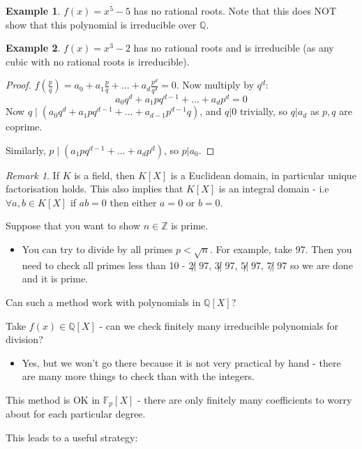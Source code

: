 \documentclass{article}
\theoremstyle{definition}
\newtheorem{exmp}{Example}[section]
\theoremstyle{plain}%
\theoremstyle{remark}
\newtheorem*{rem}{Remark}
\newcommand{\Q}{\mathbb{Q}}
\newcommand{\Z}{\mathbb{Z}}
\newcommand{\F}{\mathbb{F}}
\begin{document}
\begin{exmp}
    $f(x) = x^5 - 5$ has no rational roots. Note that this does NOT show that this polynomial is irreducible over $\Q$.
\end{exmp}

\begin{exmp}
    $f(x) = x^3 - 2$ has no rational roots and is irreducible (as any cubic with no rational roots is irreducible).
\end{exmp}

\begin{proof}
    $f(\frac{p}{q}) = a_0 + a_1 \frac{p}{q} + ... + a_d \frac{p^d}{q^d} = 0$. Now multiply by $q^d$:
    \[a_0q^d + a_1pq^{d-1} + ... + a_d p^d = 0\]
    Now $q \; |\; (a_0q^d + a_1pq^{d-1} + ... + a_{d-1}p^{d-1}q)$, and $q | 0$ trivially, so $q | a_d$ as $p, q$ are coprime.
    
    Similarly, $p \; | \; (a_1pq^{d-1} + ... + a_dp^d)$, so $p | a_0$.
\end{proof}

\begin{rem}
    If $K$ is a field, then $K[X]$ is a Euclidean domain, in particular unique factorisation holds. This also implies that $K[X]$ is an integral domain - i.e $\forall a,b \in K[X]$ if $ab = 0$ then either $a = 0$ or $b = 0$.
\end{rem}

Suppose that you want to show $n \in \Z$ is prime.
\begin{itemize}
    \item You can try to divide by all primes $p < \sqrt{n}$. For example, take $97$. Then you need to check all primes less than 10 - $2 \not | \; 97$, $3 \not | \; 97$, $5 \not | \; 97$, $7 \not | \; 97$ so we are done and it is prime.
\end{itemize}

Can such a method work with polynomials in $\Q[X]$?

Take $f(x) \in \Q[X]$ - can we check finitely many irreducible polynomials for division?
\begin{itemize}
    \item Yes, but we won't go there because it is not very practical by hand - there are many more things to check than with the integers.
\end{itemize}

This method is OK in $\F_p[X]$ - there are only finitely many coefficients to worry about for each particular degree.

This leads to a useful strategy:
\end{document}
